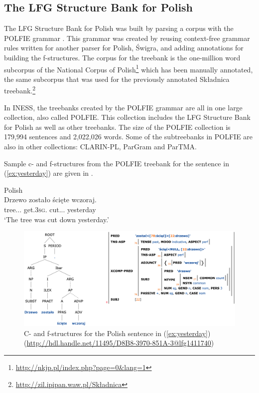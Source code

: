 \documentclass[output=paper,hidelinks]{langscibook}
\begin{document}


\subsection{The LFG Structure Bank for Polish}\label{polfie}

The LFG Structure Bank for Polish was built by parsing a corpus with the POLFIE grammar \citep{patprz12,patprz14}.
This grammar was created by reusing context-free grammar rules written for another parser for Polish, Świgra, and adding annotations for building the f-structures.
The corpus for the treebank is the one-million word subcorpus of the National Corpus of Polish\footnote{\url{http://nkjp.pl/index.php?page=0&lang=1}} which has been manually annotated, the same subcorpus that was used for the previously annotated Składnica treebank.\footnote{\url{http://zil.ipipan.waw.pl/Składnica}} 

In INESS, the treebanks created by the POLFIE grammar are all in one large collection, also called POLFIE.
This collection includes the LFG Structure Bank for Polish as well as other treebanks.
The size of the POLFIE collection is 179,994 sentences and 2,022,026 words.
Some of the subtreebanks in POLFIE are also in other collections: CLARIN-PL, ParGram and ParTMA.

Sample c- and f-structures from the POLFIE treebank for the sentence in (\ref{ex:yesterday}) are given in .%

\ea Polish\\
\gll Drzewo zostało ścięte wczoraj.\\
     {tree.\NOM.\SG.\N}  get.\textsc{3sg.\N} {cut.\NOM.\SG.\N} yesterday\\ 
\glt `The tree was cut down yesterday.'
\label{ex:yesterday}
\z

\begin{figure}
    \includegraphics[width=\textwidth]{figures/Treebanks/Polish-cf}
    \caption{C- and f-structures for the Polish sentence in (\ref{ex:yesterday}) (\url{http://hdl.handle.net/11495/D8B8-3970-851A-3@lfg1411740})
    \label{fig:Polish-cf}}
\end{figure}
\end{document}
